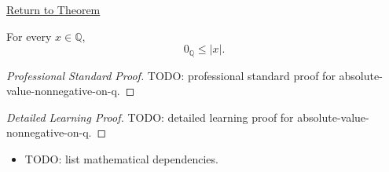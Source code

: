 \newpage
{}
\label{prf:absolute-value-nonnegative-on-q}

\begin{remark*}[Return]
\hyperref[thm:absolute-value-nonnegative-on-q]{Return to Theorem}
\end{remark*}

\begin{theorem*}
For every $x\in\mathbb{Q}$,
\[
0_{\mathbb{Q}}\le |x|.
\]
\end{theorem*}

\begin{proof}[Professional Standard Proof]
\LRAProofBodyStart
TODO: professional standard proof for absolute-value-nonnegative-on-q.
\end{proof}

\begin{proof}[Detailed Learning Proof]
\LRAProofBodyStart
TODO: detailed learning proof for absolute-value-nonnegative-on-q.
\end{proof}

\begin{remark*}
\end{remark*}

\begin{dependencies}
\begin{itemize}
  \item TODO: list mathematical dependencies.
\end{itemize}
\end{dependencies}

\clearpage

